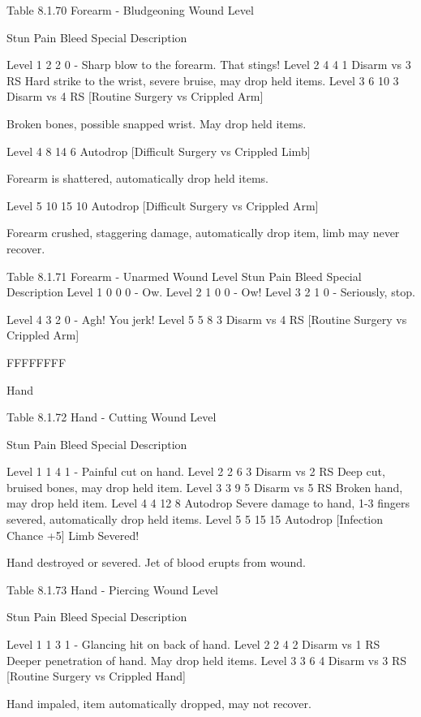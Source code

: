 \documentclass[oneside,11pt,english]{book}
\begin{document}
 
Table 8.1.70 Forearm - Bludgeoning 
Wound 
Level 

Stun Pain Bleed Special Description 

Level 1 2 2 0 - Sharp blow to the forearm. That stings! 
Level 2 4 4 1 Disarm vs 3 RS Hard strike to the wrist, severe bruise, may drop 
held items. 
Level 3 6 10 3 Disarm vs 4 RS 
[Routine Surgery vs 
Crippled Arm] 

Broken bones, possible snapped wrist. May drop 
held items. 

Level 4 8 14 6 Autodrop 
[Difficult Surgery vs 
Crippled Limb] 

Forearm is shattered, automatically drop held items. 

Level 5 10 15 10 Autodrop 
[Difficult Surgery vs 
Crippled Arm] 

Forearm crushed, staggering damage, automatically 
drop item, limb may never recover. 

 
Table 8.1.71 Forearm - Unarmed 
Wound Level Stun Pain Bleed Special Description 
Level 1 0 0 0 - Ow. 
Level 2 1 0 0 - Ow! 
Level 3 2 1 0 - Seriously, stop. 


Level 4 3 2 0 - Agh! You jerk! 
Level 5 5 8 3 Disarm vs 4 RS 
[Routine Surgery vs Crippled Arm] 

FFFFFFFF 

 

 

Hand 

 

Table 8.1.72 Hand - Cutting 
Wound 
Level 

Stun Pain Bleed Special Description 

Level 1 1 4 1 - Painful cut on hand. 
Level 2 2 6 3 Disarm vs 2 RS Deep cut, bruised bones, may drop held item. 
Level 3 3 9 5 Disarm vs 5 RS Broken hand, may drop held item. 
Level 4 4 12 8 Autodrop Severe damage to hand, 1-3 fingers severed, 
automatically drop held items. 
Level 5 5 15 15 Autodrop 
[Infection Chance 
+5] 
Limb Severed! 

Hand destroyed or severed. Jet of blood erupts from 
wound. 

 
Table 8.1.73 Hand - Piercing 
Wound 
Level 

Stun Pain Bleed Special Description 

Level 1 1 3 1 - Glancing hit on back of hand. 
Level 2 2 4 2 Disarm vs 1 RS Deeper penetration of hand. May drop held items. 
Level 3 3 6 4 Disarm vs 3 RS 
[Routine Surgery vs 
Crippled Hand] 

Hand impaled, item automatically dropped, may 
not recover. 
\end{document}
